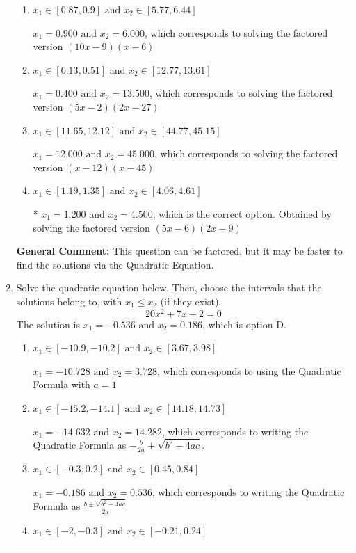 \documentclass{extbook}[14pt]
\newcommand{\litem}[1]{\item #1

\rule{\textwidth}{0.4pt}}
\begin{document}
\begin{enumerate}
{\begin{enumerate}[label=\Alph*.]
$x_1 = 2.250 \text{ and } x_2 = 2.400$, which corresponds to solving the factored version $(2x -4)(5x -12)$
\item \( x_1 \in [0.87, 0.9] \text{ and } x_2 \in [5.77, 6.44] \)

$x_1 = 0.900 \text{ and } x_2 = 6.000$, which corresponds to solving the factored version $(10x -9)(x -6)$
\item \( x_1 \in [0.13, 0.51] \text{ and } x_2 \in [12.77, 13.61] \)

$x_1 = 0.400 \text{ and } x_2 = 13.500$, which corresponds to solving the factored version $(5x -2)(2x -27)$
\item \( x_1 \in [11.65, 12.12] \text{ and } x_2 \in [44.77, 45.15] \)

$x_1 = 12.000 \text{ and } x_2 = 45.000$, which corresponds to solving the factored version $(x -12)(x -45)$
\item \( x_1 \in [1.19, 1.35] \text{ and } x_2 \in [4.06, 4.61] \)

* $x_1 = 1.200 \text{ and } x_2 = 4.500$, which is the correct option. Obtained by solving the factored version $(5x -6)(2x -9)$
\end{enumerate}

\textbf{General Comment:} This question can be factored, but it may be faster to find the solutions via the Quadratic Equation.
}
\litem{
Solve the quadratic equation below. Then, choose the intervals that the solutions belong to, with $x_1 \leq x_2$ (if they exist).
\[ 20x^{2} +7 x -2 = 0 \]
The solution is \( x_1 = -0.536 \text{ and } x_2 = 0.186 \), which is option D.\begin{enumerate}[label=\Alph*.]
\item \( x_1 \in [-10.9, -10.2] \text{ and } x_2 \in [3.67, 3.98] \)

 $x_1 = -10.728 \text{ and } x_2 = 3.728$, which corresponds to using the Quadratic Formula with $a=1$
\item \( x_1 \in [-15.2, -14.1] \text{ and } x_2 \in [14.18, 14.73] \)

 $x_1 = -14.632 \text{ and } x_2 = 14.282$, which corresponds to writing the Quadratic Formula as $-\frac{b}{2a} \pm \sqrt{b^2 - 4ac}$.
\item \( x_1 \in [-0.3, 0.2] \text{ and } x_2 \in [0.45, 0.84] \)

 $x_1 = -0.186 \text{ and } x_2 = 0.536$, which corresponds to writing the Quadratic Formula as $\frac{b \pm \sqrt{b^2 - 4ac}}{2a}$
\item \( x_1 \in [-2, -0.3] \text{ and } x_2 \in [-0.21, 0.24] \)


\end{enumerate}}
\end{enumerate}
\end{document}
